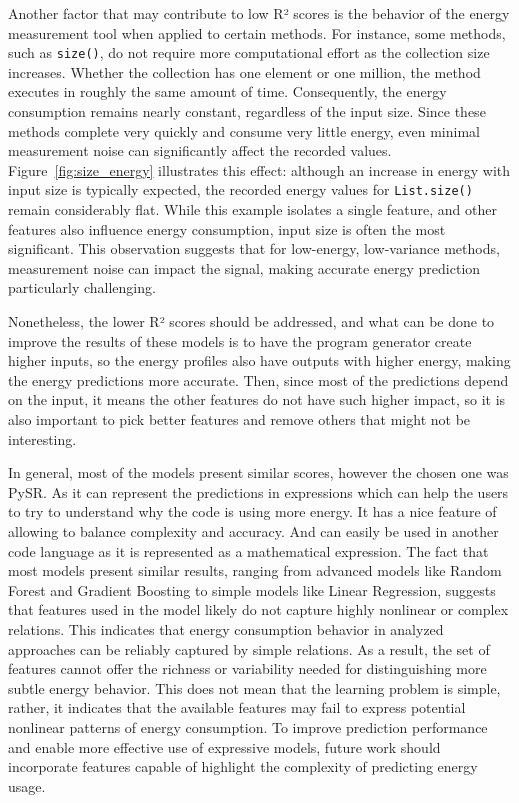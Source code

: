 Another factor that may contribute to low R² scores is the behavior of the energy measurement tool when applied to certain methods. For instance, some methods, such as \texttt{size()}, do not require more computational effort as the collection size increases. Whether the collection has one element or one million, the method executes in roughly the same amount of time. Consequently, the energy consumption remains nearly constant, regardless of the input size. Since these methods complete very quickly and consume very little energy, even minimal measurement noise can significantly affect the recorded values. Figure~\ref{fig:size_energy} illustrates this effect: although an increase in energy with input size is typically expected, the recorded energy values for \texttt{List.size()} remain considerably flat. While this example isolates a single feature, and other features also influence energy consumption, input size is often the most significant. This observation suggests that for low-energy, low-variance methods, measurement noise can impact the signal, making accurate energy prediction particularly challenging.


Nonetheless, the lower R² scores should be addressed, and what can be done to improve the results of these models is to have the program generator create higher inputs, so the energy profiles also have outputs with higher energy, making the energy predictions more accurate. Then, since most of the predictions depend on the input, it means the other features do not have such higher impact, so it is also important to pick better features and remove others that might not be interesting. 



In general, most of the models present similar scores, however the chosen one was PySR. As it can represent the predictions in expressions which can help the users to try to understand why the code is using more energy. It has a nice feature of allowing to balance complexity and accuracy. And can easily be used in another code language as it is represented as a mathematical expression.
The fact that most models present similar results, ranging from advanced models like Random Forest and Gradient Boosting to simple models like Linear Regression, suggests that features used in the model likely do not capture highly nonlinear or complex relations. This indicates that energy consumption behavior in analyzed approaches can be reliably captured by simple relations. As a result, the set of features cannot offer the richness or variability needed for distinguishing more subtle energy behavior. This does not mean that the learning problem is simple, rather, it indicates that the available features may fail to express potential nonlinear patterns of energy consumption. To improve prediction performance and enable more effective use of expressive models, future work should incorporate features capable of highlight the complexity of predicting energy usage.




